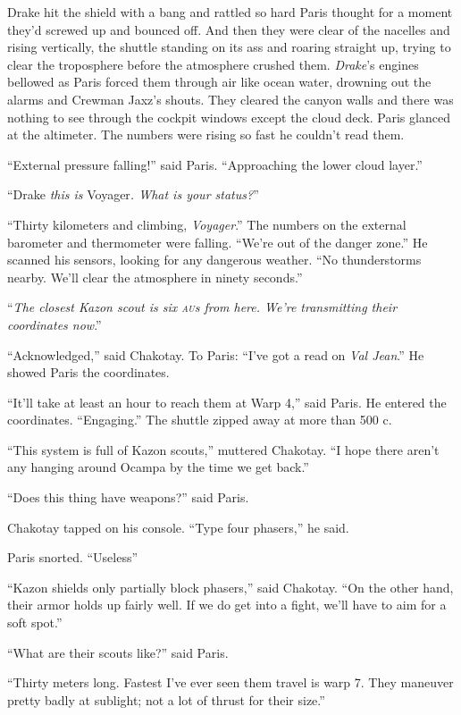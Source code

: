 \documentclass[twoside,letterpaper,12pt]{memoir}
\begin{document}
Drake hit the shield with a bang and rattled so hard Paris thought for a moment they'd screwed up and bounced off. And then they were clear of the nacelles and rising vertically, the shuttle standing on its ass and roaring straight up, trying to clear the troposphere before the atmosphere crushed them. \textit{Drake}'s engines bellowed as Paris forced them through air like ocean water, drowning out the alarms and Crewman Jaxz's shouts. They cleared the canyon walls and there was nothing to see through the cockpit windows except the cloud deck. Paris glanced at the altimeter. The numbers were rising so fast he couldn't read them.

``External pressure falling!'' said Paris. ``Approaching the lower cloud layer.''

``Drake \textit{this is }Voyager\textit{. What is your status?}''

``Thirty kilometers and climbing, \textit{Voyager}.'' The numbers on the external barometer and thermometer were falling. ``We're out of the danger zone.'' He scanned his sensors, looking for any dangerous weather. ``No thunderstorms nearby. We'll clear the atmosphere in ninety seconds.''

``\textit{The closest Kazon scout is six \textsc{au}s from here. We're transmitting their coordinates now}.''

``Acknowledged,'' said Chakotay. To Paris: ``I've got a read on \textit{Val Jean}.'' He showed Paris the coordinates.

``It'll take at least an hour to reach them at Warp 4,'' said Paris. He entered the coordinates. ``Engaging.'' The shuttle zipped away at more than 500 c.

``This system is full of Kazon scouts,'' muttered Chakotay. ``I hope there aren't any hanging around Ocampa by the time we get back.''

``Does this thing have weapons?'' said Paris.

Chakotay tapped on his console. ``Type four phasers,'' he said.

Paris snorted. ``Useless''

``Kazon shields only partially block phasers,'' said Chakotay. ``On the other hand, their armor holds up fairly well. If we do get into a fight, we'll have to aim for a soft spot.''

``What are their scouts like?'' said Paris.

``Thirty meters long. Fastest I've ever seen them travel is warp 7. They maneuver pretty badly at sublight; not a lot of thrust for their size.''
\end{document}
